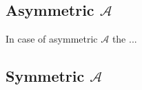 \documentclass{llncs}
\begin{document}











\subsection{Asymmetric $\mathcal{A}$}

In case of asymmetric $\mathcal{A}$ the ...

\subsection{Symmetric $\mathcal{A}$}
 
\end{document}
